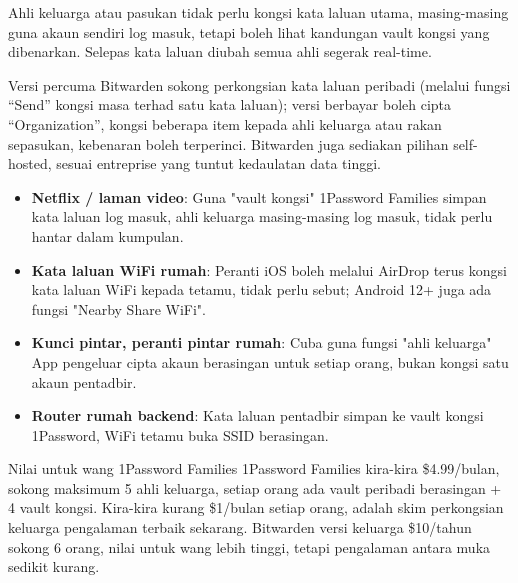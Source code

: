 Ahli keluarga atau pasukan tidak perlu kongsi kata laluan utama, masing-masing guna akaun sendiri log masuk, tetapi boleh lihat kandungan vault kongsi yang dibenarkan. Selepas kata laluan diubah semua ahli segerak real-time.


Versi percuma Bitwarden sokong perkongsian kata laluan peribadi (melalui fungsi “Send” kongsi masa terhad satu kata laluan); versi berbayar boleh cipta “Organization”, kongsi beberapa item kepada ahli keluarga atau rakan sepasukan, kebenaran boleh terperinci. Bitwarden juga sediakan pilihan self-hosted, sesuai entreprise yang tuntut kedaulatan data tinggi.


\begin{itemize}
  \item \textbf{Netflix / laman video}: Guna "vault kongsi" 1Password Families simpan kata laluan log masuk, ahli keluarga masing-masing log masuk, tidak perlu hantar dalam kumpulan.
  \item \textbf{Kata laluan WiFi rumah}: Peranti iOS boleh melalui AirDrop terus kongsi kata laluan WiFi kepada tetamu, tidak perlu sebut; Android 12+ juga ada fungsi "Nearby Share WiFi".
  \item \textbf{Kunci pintar, peranti pintar rumah}: Cuba guna fungsi "ahli keluarga" App pengeluar cipta akaun berasingan untuk setiap orang, bukan kongsi satu akaun pentadbir.
  \item \textbf{Router rumah backend}: Kata laluan pentadbir simpan ke vault kongsi 1Password, WiFi tetamu buka SSID berasingan.
\end{itemize}

\begin{tcbinfo}{Nilai untuk wang 1Password Families}
1Password Families kira-kira \$4.99/bulan, sokong maksimum 5 ahli keluarga, setiap orang ada vault peribadi berasingan + 4 vault kongsi. Kira-kira kurang \$1/bulan setiap orang, adalah skim perkongsian keluarga pengalaman terbaik sekarang. Bitwarden versi keluarga \$10/tahun sokong 6 orang, nilai untuk wang lebih tinggi, tetapi pengalaman antara muka sedikit kurang.

\end{tcbinfo}


